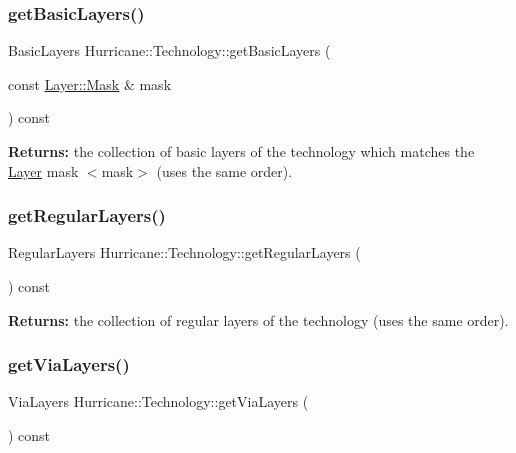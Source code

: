 \subsubsection{\texorpdfstring{get\+Basic\+Layers()}{getBasicLayers()}\hspace{0.1cm}{\footnotesize\ttfamily [2/2]}}
{\footnotesize\ttfamily Basic\+Layers Hurricane\+::\+Technology\+::get\+Basic\+Layers (\begin{DoxyParamCaption}\item[{const \hyperlink{classHurricane_1_1Layer_af5277c670637bd5d910237e7afe01a91}{Layer\+::\+Mask} \&}]{mask }\end{DoxyParamCaption}) const}

{\bfseries Returns\+:} the collection of basic layers of the technology which matches the \hyperlink{classHurricane_1_1Layer}{Layer} mask {\ttfamily $<$mask$>$} (uses the same order). \mbox{\label{classHurricane_1_1Technology_abffce542bc1cee054b4a09c64449f3b8}} 
\subsubsection{\texorpdfstring{get\+Regular\+Layers()}{getRegularLayers()}}
{\footnotesize\ttfamily Regular\+Layers Hurricane\+::\+Technology\+::get\+Regular\+Layers (\begin{DoxyParamCaption}{ }\end{DoxyParamCaption}) const}

{\bfseries Returns\+:} the collection of regular layers of the technology (uses the same order). \mbox{\label{classHurricane_1_1Technology_aacde973f6a02a232a01f3f618576e1ee}} 
\subsubsection{\texorpdfstring{get\+Via\+Layers()}{getViaLayers()}}
{\footnotesize\ttfamily Via\+Layers Hurricane\+::\+Technology\+::get\+Via\+Layers (\begin{DoxyParamCaption}{ }\end{DoxyParamCaption}) const}

